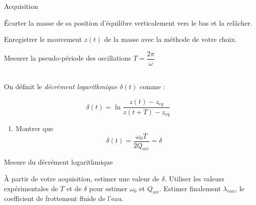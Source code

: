 \documentclass[a4paper,french,bookmarks]{article}
\begin{document}
\begin{experience}{Acquisition}{}
    \begin{enumerate}
        \ithand Écarter la masse de sa position d’équilibre verticalement vers le bas et la relâcher.
        
        \ithand Enregistrer le mouvement $z(t)$ de la masse avec la méthode de votre choix.
        
        \ithand Mesurer la pseudo-période des oscillations $T = \dfrac{2\pi}{\omega}$
    \end{enumerate}
\end{experience} 


\text{}\\On définit le \textit{décrément logarithmique $\delta(t)$} comme :

\begin{equation}
    \delta(t) = \ln{\dfrac{z(t) - z_{eq}}{z(t+T)-z_{eq}}}
\end{equation}

\begin{enumerate}[resume]
    \item Montrer que
    \begin{equation}
        \delta(t) = \dfrac{\omega_0 T}{2Q_{air}} = \delta
    \end{equation}
    
\end{enumerate}

\begin{experience}{Mesure du décrément logarithmique}{}
    \begin{enumerate}
        \ithand À partir de votre acquisition, estimer une valeur de $\delta$.
        \ithand Utiliser les valeurs expérimentales de $T$ et de $\delta$ pour estimer $\omega_0$ et $Q_{air}$.
        \ithand Estimer finalement $\lambda_{eau}$, le coefficient de frottement fluide de l’eau.
    \end{enumerate}
\end{experience}
\end{document}
